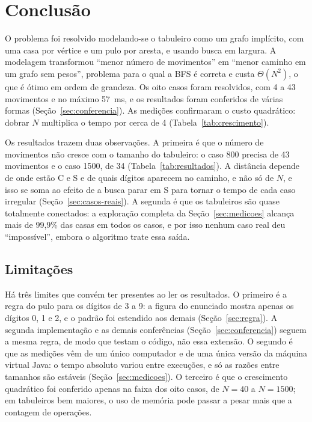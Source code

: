 \section{Conclusão}
\label{sec:conclusao}

O problema foi resolvido modelando-se o tabuleiro como um grafo implícito, com uma casa por vértice e
um pulo por aresta, e usando busca em largura. A modelagem transformou ``menor número de
movimentos'' em ``menor caminho em um grafo sem pesos'', problema para o qual a BFS é correta e
custa $\Theta(N^2)$, o que é ótimo em ordem de grandeza. Os oito casos foram resolvidos, com 4
a 43 movimentos e no máximo 57~ms, e os resultados foram conferidos de várias formas
(Seção~\ref{sec:conferencia}). As medições confirmaram o custo quadrático: dobrar $N$ multiplica
o tempo por cerca de 4 (Tabela~\ref{tab:crescimento}).

Os resultados trazem duas observações. A primeira é que o número de movimentos não cresce com o
tamanho do tabuleiro: o caso 800 precisa de 43 movimentos e o caso 1500, de 34
(Tabela~\ref{tab:resultados}). A distância depende de onde estão C e S e de quais dígitos
aparecem no caminho, e não só de $N$, e isso se soma ao efeito de a busca parar em S para tornar
o tempo de cada caso irregular (Seção~\ref{sec:casos-reais}). A segunda é que os tabuleiros são
quase totalmente conectados: a exploração completa da Seção~\ref{sec:medicoes} alcança mais de
99,9\% das casas em todos os casos, e por isso nenhum caso real deu ``impossível'', embora o
algoritmo trate essa saída.

\subsection{Limitações}
\label{sec:limitacoes}

Há três limites que convém ter presentes ao ler os resultados. O primeiro é a regra do pulo para
os dígitos de 3 a 9: a figura do enunciado mostra apenas os dígitos 0, 1 e 2, e o padrão foi
estendido aos demais (Seção~\ref{sec:regra}). A segunda implementação e as demais conferências
(Seção~\ref{sec:conferencia}) seguem a mesma regra, de modo que testam o código, não essa
extensão. O segundo é que as medições vêm de um único computador e de uma única versão da
máquina virtual Java: o tempo absoluto variou entre execuções, e só as razões entre tamanhos são
estáveis (Seção~\ref{sec:medicoes}). O terceiro é que o crescimento quadrático foi conferido
apenas na faixa dos oito casos, de $N = 40$ a $N = 1500$; em tabuleiros bem maiores, o uso de
memória pode passar a pesar mais que a contagem de operações.

